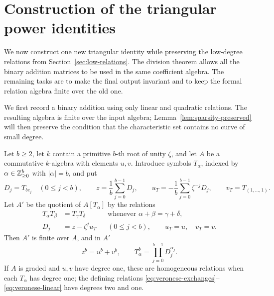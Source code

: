 \section{Construction of the triangular power identities}
\label{sec:assembly}

We now construct one new triangular identity while preserving the low-degree
relations from Section~\ref{sec:low-relations}.  The division theorem allows
all the binary addition matrices to be used in the same coefficient algebra.
The remaining tasks are to make the final output invariant and to keep the
formal relation algebra finite over the old one.

We first record a binary addition using only linear and quadratic
relations.  The resulting algebra is finite over the input algebra;
Lemma~\ref{lem:sparsity-preserved} will then preserve the condition that
the characteristic set contains no curve of small degree.

\begin{lemma}
\label{lem:veronese-extension}
Let \(b\ge2\), let \(k\) contain a primitive \(b\)-th root of unity
\(\zeta\), and let \(A\) be a commutative \(k\)-algebra with elements \(u,v\).
Introduce symbols \(T_\alpha\), indexed by
\(\alpha\in\mathbb Z_{\ge0}^{b}\) with \(|\alpha|=b\), and put
\[
 D_j=T_{b e_j}\quad(0\le j<b),\qquad
 z=\frac1b\sum_{j=0}^{b-1}D_j,\qquad
 u_T=-\frac1b\sum_{j=0}^{b-1}\zeta^{-j}D_j,\qquad
 v_T=T_{(1,\ldots,1)}.
\]
Let \(A'\) be the quotient of \(A[T_\alpha]\) by the relations
\begin{align}
 T_\alpha T_\beta&=T_\gamma T_\delta
       &&\text{whenever }\alpha+\beta=\gamma+\delta,
       \label{eq:veronese-exchanges}\\
 D_j&=z-\zeta^j u_T
       &&(0\le j<b),\qquad u_T=u,\quad v_T=v.
       \label{eq:veronese-linear}
\end{align}
Then \(A'\) is finite over \(A\), and in \(A'\)
\begin{equation}
 z^b=u^b+v^b,\qquad
 T_\alpha^b=\prod_{j=0}^{b-1}D_j^{\alpha_j}.
 \label{eq:veronese-monic}
\end{equation}
If \(A\) is graded and \(u,v\) have degree one, these are homogeneous
relations when each \(T_\alpha\) has degree one; the defining relations
\eqref{eq:veronese-exchanges}--\eqref{eq:veronese-linear} have degrees two
and one.
\end{lemma}

